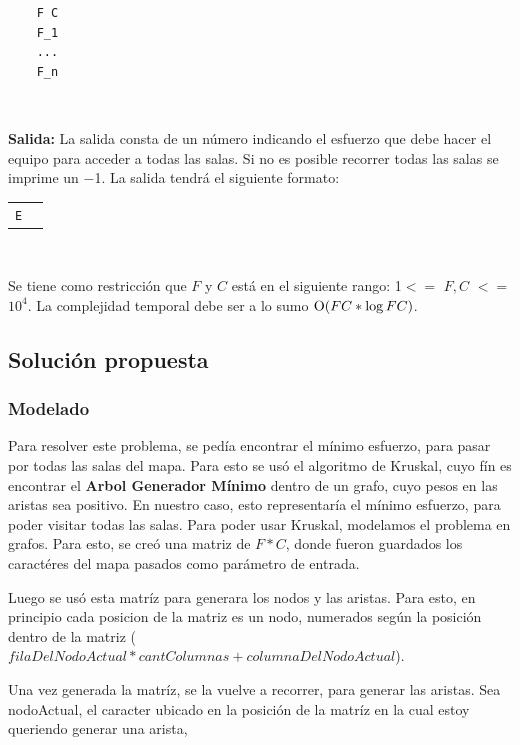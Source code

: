 	\begin{verbatim}
    F C
    F_1
    ...
    F_n
    \end{verbatim}
    

	~

	\textbf{Salida:} La salida consta de un número indicando el esfuerzo que debe hacer el equipo para acceder a todas las salas. Si no es posible recorrer todas las salas se imprime un −1. La salida tendrá el siguiente formato:\par
	
	\begin{tabular}{ll}
		\texttt{E}
	\end{tabular}



	~

	Se tiene como restricción que $F$ y $C$ está en el siguiente rango: 1$<=$ $F,C$ $<=$ $10^{4}$. La complejidad temporal debe ser a lo sumo $\operatorname{O}(FC * \log{FC}{})$.

    
    \subsection{Solución propuesta}

    \subsubsection{Modelado}

    Para resolver este problema, se pedía encontrar el mínimo esfuerzo, para pasar por todas las salas del mapa. Para esto se usó el algoritmo de Kruskal, cuyo fín es encontrar el \textbf{Arbol Generador Mínimo} dentro de un grafo, cuyo pesos en las aristas sea positivo. En nuestro caso, esto representaría el mínimo esfuerzo, para poder visitar todas las salas. Para poder usar Kruskal, modelamos el problema en grafos. Para esto, se creó una matriz de $F*C$, donde fueron guardados los caractéres del mapa pasados como parámetro de entrada.\par
    Luego se usó esta matríz para generara los nodos y las aristas. Para esto, en principio cada posicion de la matriz es un nodo, numerados según la posición dentro de la matriz ($filaDelNodoActual * cantColumnas + columnaDelNodoActual$). \par
    Una vez generada la matríz, se la vuelve a recorrer, para generar las aristas. Sea nodoActual, el caracter ubicado en la posición de la matríz en la cual estoy queriendo generar una arista,

